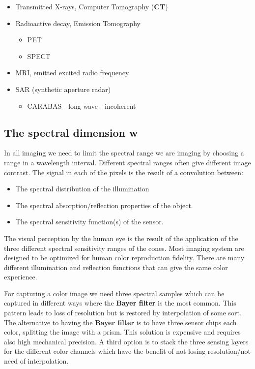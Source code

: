 \begin{itemize}
	\item Transmitted X-rays, Computer Tomography (\textbf{CT})
	\item Radioactive decay, Emission Tomography
	\begin{itemize}
		\item PET
		\item SPECT
	\end{itemize}
	\item MRI, emitted excited radio frequency
	\item SAR (synthetic aperture radar)
	\begin{itemize}
		\item CARABAS - long wave - incoherent
	\end{itemize}
\end{itemize}

\subsection{The spectral dimension \textbf{w}}
In all imaging we need to limit the spectral range we are imaging by choosing a range in a wavelength interval. Different spectral ranges often give different image contrast. The signal in each of the pixels is the result of a convolution between:
\begin{itemize}
 	\item The spectral distribution of the illumination
 	\item The spectral absorption/reflection properties of the object.
 	\item The spectral sensitivity function(s) of the sensor. 
 \end{itemize} 

The visual perception by the human eye is the result of the application of the three different spectral sensitivity ranges of the cones. Most imaging system are designed to be optimized for human color reproduction fidelity. There are many different illumination and reflection functions that can give the same color experience. 

For capturing a color image we need three spectral samples which can be captured in different ways where the \textbf{Bayer filter} is the most common. This pattern leads to loss of resolution but is restored by interpolation of some sort. The alternative to having the \textbf{Bayer filter} is to have three sensor chips each color, splitting the image with a prism. This solution is expensive and requires also high mechanical precision. A third option is to stack the three sensing layers for the different color channels which have the benefit of not losing resolution/not need of interpolation. 

